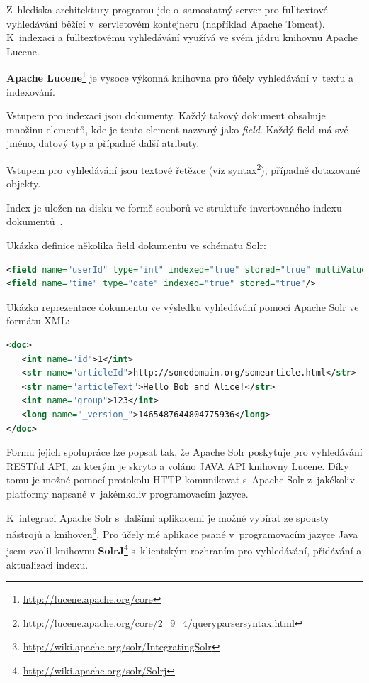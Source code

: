 \documentclass[thesis=M,czech]{FITthesis}[2014/05/07]
\begin{document}
Z~hlediska architektury programu jde o~samostatný server pro fulltextové vyhledávání běžící v~servletovém kontejneru (například Apache Tomcat). K~indexaci a fulltextovému vyhledávání využívá ve svém jádru knihovnu Apache Lucene. 

\textbf{Apache Lucene}\footnote{\url{http://lucene.apache.org/core}} je vysoce výkonná knihovna pro účely vyhledávání v~textu a indexování.

Vstupem pro indexaci jsou dokumenty. Každý takový dokument obsahuje množinu elementů, kde je tento element nazvaný jako \emph{field}. Každý field má své jméno, datový typ a případně další atributy.

Vstupem pro vyhledávání jsou textové řetězce (viz syntax\footnote{\url{http://lucene.apache.org/core/2_9_4/queryparsersyntax.html}}), případně dotazované objekty.

Index je uložen na disku ve formě souborů ve struktuře invertovaného indexu dokumentů~\cite{wiki:invindex}.

Ukázka definice několika field dokumentu ve schématu Solr:

\begin{lstlisting}[language=xml]
<field name="userId" type="int" indexed="true" stored="true" multiValued="true"/>	
<field name="time" type="date" indexed="true" stored="true"/>
\end{lstlisting}

Ukázka reprezentace dokumentu ve výsledku vyhledávání pomocí Apache Solr ve formátu XML:

\begin{lstlisting}[language=xml]
<doc>
   <int name="id">1</int>
   <str name="articleId">http://somedomain.org/somearticle.html</str>
   <str name="articleText">Hello Bob and Alice!</str>
   <int name="group">123</int>
   <long name="_version_">1465487644804775936</long>      
</doc>
\end{lstlisting}

Formu jejich spolupráce lze popsat tak, že Apache Solr poskytuje pro vyhledávání RESTful API, za kterým je skryto a voláno JAVA API knihovny Lucene. Díky tomu je možné pomocí protokolu HTTP komunikovat s~Apache Solr z~jakékoliv platformy napsané v~jakémkoliv programovacím jazyce. 

K~integraci Apache Solr s~dalšími aplikacemi je možné vybírat ze spousty nástrojů a knihoven\footnote{\url{http://wiki.apache.org/solr/IntegratingSolr}}. Pro účely mé aplikace psané v~programovacím jazyce Java jsem zvolil knihovnu \textbf{SolrJ}\footnote{\url{http://wiki.apache.org/solr/Solrj}} s~klientským rozhraním pro vyhledávání, přidávání a aktualizaci indexu. 
\end{document}
